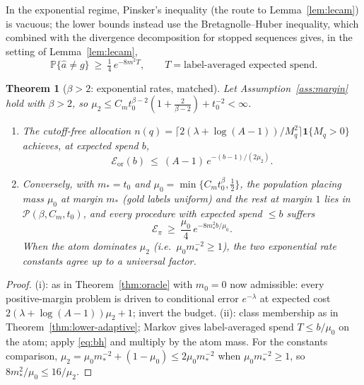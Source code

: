 \documentclass[11pt]{article}
\newtheorem{theorem}{Theorem}
\newcommand{\Pp}{\mathbb P}
\newcommand{\one}{\mathbf 1}
\newcommand{\class}{\mathcal P}
\begin{document}
In the exponential regime, Pinsker's inequality (the route to
Lemma~\ref{lem:lecam}) is vacuous; the lower bounds instead use the
Bretagnolle--Huber inequality, which combined with the divergence
decomposition for stopped sequences gives, in the setting of
Lemma~\ref{lem:lecam},
\begin{equation}
\label{eq:bh}
\Pp\{\widehat a\ne g\}
\ \ge\
\tfrac14\,e^{-8m^2T},
\qquad
T=\text{label-averaged expected spend.}
\end{equation}

\begin{theorem}[$\beta>2$: exponential rates, matched]
\label{thm:beta-gt2}
Let Assumption~\ref{ass:margin} hold with $\beta>2$, so
$\mu_2\le C_mt_0^{\beta-2}(1+\tfrac2{\beta-2})+t_0^{-2}<\infty$.
\begin{enumerate}
\item[(i)] The cutoff-free allocation
$n(q)=\lceil2(\lambda+\log(A-1))/M_q^2\rceil\one\{M_q>0\}$ achieves, at
expected spend $b$,
\[
\mathcal E_{\mathrm{or}}(b)\ \le\ (A-1)\,e^{-(b-1)/(2\mu_2)} .
\]
\item[(ii)] Conversely, with $m_*=t_0$ and
$\mu_0=\min\{C_mt_0^\beta,\frac12\}$, the population placing mass $\mu_0$
at margin $m_*$ (gold labels uniform) and the rest at margin $1$ lies in
$\class(\beta,C_m,t_0)$, and every procedure with expected spend $\le b$
suffers
\[
\mathcal E_\pi\ \ge\ \frac{\mu_0}{4}\,e^{-8m_*^2b/\mu_0} .
\]
When the atom dominates $\mu_2$ (i.e.\ $\mu_0m_*^{-2}\ge1$), the two
exponential rate constants agree up to a universal factor.
\end{enumerate}
\end{theorem}

\begin{proof}
(i): as in Theorem~\ref{thm:oracle} with $m_0=0$ now admissible: every
positive-margin problem is driven to conditional error $e^{-\lambda}$ at
expected cost $2(\lambda+\log(A-1))\mu_2+1$; invert the budget.  (ii):
class membership as in Theorem~\ref{thm:lower-adaptive}; Markov gives
label-averaged spend $T\le b/\mu_0$ on the atom; apply \eqref{eq:bh} and
multiply by the atom mass.  For the constants comparison,
$\mu_2=\mu_0m_*^{-2}+(1-\mu_0)\le2\mu_0m_*^{-2}$ when
$\mu_0m_*^{-2}\ge1$, so $8m_*^2/\mu_0\le16/\mu_2$.
\end{proof}
\end{document}
